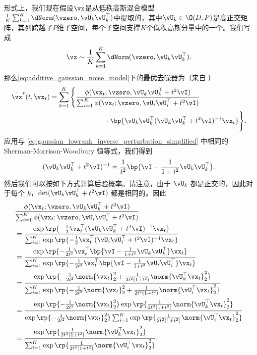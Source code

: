 \documentclass[../../book-main_zh.tex]{subfiles}
\begin{document}
形式上，我们现在假设\(\vx\)是从低秩高斯混合模型\(\frac{1}{K}\sum_{k = 1}^{K}\dNorm(\vzero, \vU_{k}\vU_{k}^{\top})\)中提取的，其中\(\vU_{k} \in \O(D, P)\)是高正交矩阵，其列跨越了\(P\)维子空间，每个子空间支撑\(K\)个低秩高斯分量中的一个。我们写成
\begin{equation}\label{eq:MoG1}
    \vx \sim \frac{1}{K}\sum_{k = 1}^{K}\dNorm(\vzero, \vU_{k}\vU_{k}^{\top}).
\end{equation}
那么\eqref{eq:additive_gaussian_noise_model}下的最优去噪器为（来自
）
\begin{align}
    \bar{\vx}^{\ast}(t, \vx_{t})
    &= \sum_{k = 1}^{K}\Bigg\{\frac{\phi(\vx_{t} ; \vzero,
        \vU_{k}\vU_{k}^{\top} + t^{2}\vI)}{\sum_{i = 1}^{K}\phi(\vx_{t} ;
                \vzero, \vU_{i}\vU_{i}^{\top} +
        t^{2}\vI)} \\
        &\qquad \qquad \qquad \qquad
        \cdot\bp{\vU_{k}\vU_{k}^{\top}(\vU_{k}\vU_{k}^{\top} +
    t^{2}\vI)^{-1}\vx_{t}}\Bigg\}.
\end{align}
应用与 \eqref{eq:gaussian_lowrank_inverse_perturbation_simplified} 中相同的 Sherman-Morrison-Woodbury 恒等式，我们得到
\begin{equation}
    (\vU_{k}\vU_{k}^{\top} + t^{2}\vI)^{-1} = \frac{1}{t^{2}}\bp{\vI
    - \frac{1}{1 + t^{2}}\vU_{k}\vU_{k}^{\top}}.
\end{equation}
然后我们可以按如下方式计算后验概率。请注意，由于 \(\vU_{k}\) 都是正交的，因此对于每个 \(k\)，\(\det(\vU_{k}\vU_{k}^{\top}
+ t^{2}\vI)\) 都是相同的。因此
\begin{align}
    &\frac{\phi(\vx_{t} ; \vzero, \vU_{k}\vU_{k}^{\top} + t^{2}\vI)}{\sum_{i
    = 1}^{K}\phi(\vx_{t} ; \vzero, \vU_{i}\vU_{i}^{\top} + t^{2}\vI)} \\
    &= \frac{\exp\rp{-\frac{1}{2}\vx_{t}^{\top}(\vU_{k}\vU_{k}^{\top}
    + t^{2}\vI)^{-1}\vx_{t}}}{\sum_{i =
        1}^{K}\exp\rp{-\frac{1}{2}\vx_{t}^{\top}(\vU_{i}\vU_{i}^{\top} +
    t^{2}\vI)^{-1}\vx_{t}}} \\
    &= \frac{\exp\rp{-\frac{1}{2t^{2}}\vx_{t}^{\top}\bp{\vI -
    \frac{1}{1 + t^{2}}\vU_{k}\vU_{k}^{\top}}\vx_{t}}}{\sum_{i =
        1}^{K}\exp\rp{-\frac{1}{2t^{2}}\vx_{t}^{\top}\bp{\vI - \frac{1}{1
    + t^{2}}\vU_{i}\vU_{i}^{\top}}\vx_{t}}} \\
    &= \frac{\exp\rp{-\frac{1}{2t^{2}}\norm{\vx_{t}}_{2}^{2} +
            \frac{1}{2t^{2}(1 +
    t^{2})}\norm{\vU_{k}^{\top}\vx_{t}}_{2}^{2}}}{\sum_{i =
        1}^{K}\exp\rp{-\frac{1}{2t^{2}}\norm{\vx_{t}}_{2}^{2} +
    \frac{1}{2t^{2}(1 + t^{2})}\norm{\vU_{i}^{\top}\vx_{t}}_{2}^{2}}} \\
    &=
    \frac{\exp\rp{-\frac{1}{2t^{2}}\norm{\vx_{t}}_{2}^{2}}\exp\rp{\frac{1}{2t^{2}(1
                    +
    t^{2})}\norm{\vU_{k}^{\top}\vx_{t}}_{2}^{2}}}{\exp\rp{-\frac{1}{2t^{2}}\norm{\vx_{t}}_{2}^{2}}\sum_{i
        = 1}^{K}\exp\rp{\frac{1}{2t^{2}(1 +
    t^{2})}\norm{\vU_{i}^{\top}\vx_{t}}_{2}^{2}}} \\
    &= \frac{\exp\rp{\frac{1}{2t^{2}(1 +
    t^{2})}\norm{\vU_{k}^{\top}\vx_{t}}_{2}^{2}}}{\sum_{i =
        1}^{K}\exp\rp{\frac{1}{2t^{2}(1 +
    t^{2})}\norm{\vU_{i}^{\top}\vx_{t}}_{2}^{2}}}.
\end{align}
\end{document}
